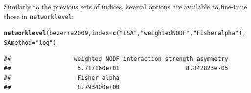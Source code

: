\documentclass[a4paper, 11pt]{article}\usepackage[]{graphicx}\usepackage[dvipsnames]{xcolor}
\makeatletter
\newcommand{\hlstr}[1]{\textcolor[rgb]{0.192,0.494,0.8}{#1}}%
\newcommand{\hlstd}[1]{\textcolor[rgb]{0.345,0.345,0.345}{#1}}%
\newcommand{\hlkwc}[1]{\textcolor[rgb]{0.333,0.667,0.333}{#1}}%
\newcommand{\hlkwd}[1]{\textcolor[rgb]{0.737,0.353,0.396}{\textbf{#1}}}%
\newenvironment{kframe}{%
 \def\at@end@of@kframe{}%
 \ifinner\ifhmode%
  \def\at@end@of@kframe{\end{minipage}}%
  \begin{minipage}{\columnwidth}%
 \fi\fi%
 \def\FrameCommand##1{\hskip\@totalleftmargin \hskip-\fboxsep
 \colorbox{shadecolor}{##1}\hskip-\fboxsep
     \hskip-\linewidth \hskip-\@totalleftmargin \hskip\columnwidth}%
 \MakeFramed {\advance\hsize-\width
   \@totalleftmargin\z@ \linewidth\hsize
   \@setminipage}}%
 {\par\unskip\endMakeFramed%
 \at@end@of@kframe}
\newenvironment{knitrout}{}{} %
\makeatother
\begin{document}
\noindent Similarly to the previous sets of indices, several options are available to fine-tune those in \texttt{networklevel}:
\begin{knitrout}
\color{fgcolor}\begin{kframe}
\begin{alltt}
\hlkwd{networklevel}\hlstd{(bezerra2009,} \hlkwc{index}\hlstd{=}\hlkwd{c}\hlstd{(}\hlstr{"ISA"}\hlstd{,} \hlstr{"weighted NODF"}\hlstd{,} \hlstr{"Fisher alpha"}\hlstd{),}
             \hlkwc{SAmethod}\hlstd{=}\hlstr{"log"}\hlstd{)}
\end{alltt}
\begin{verbatim}
##                  weighted NODF interaction strength asymmetry 
##                   5.717160e+01                   8.842823e-05 
##                   Fisher alpha 
##                   8.793400e+00
\end{verbatim}
\end{kframe}
\end{knitrout}
\end{document}
